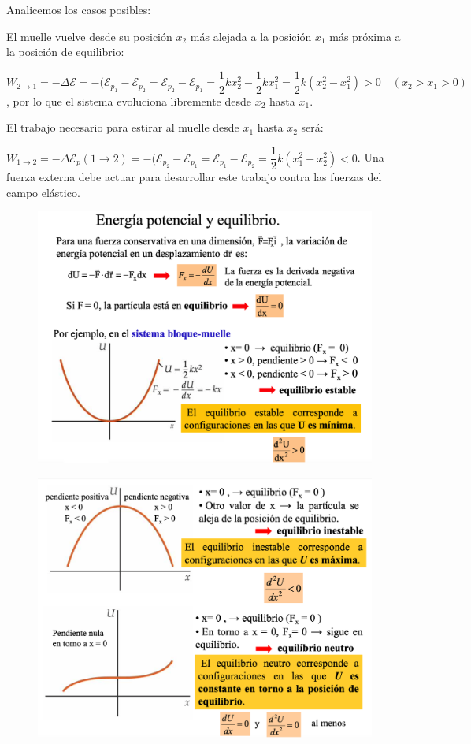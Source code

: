 Analicemos los casos posibles:

El muelle vuelve desde su posición $x_2$ más alejada a la posición $x_1$ más próxima a la posición de equilibrio:

$W_{2 \to 1}=-\Delta \mathcal E=-(\mathcal E_{p_1}-\mathcal E_{p_2}=\mathcal E_{p_2}-\mathcal E_{p_1}=\dfrac 1 2 k x_2^2- \dfrac 1 2 k x_1^2=\dfrac 12 k (x_2^2-x_1^2)>0 \quad (x_2>x_1>0)$, por lo que el sistema evoluciona libremente desde $x_2$ hasta $x_1$.

El trabajo necesario para estirar al muelle desde $x_1$ hasta $x_2$ será:

$W_{1 \to 2}=-\Delta \mathcal E_p (1 \to 2)=-(\mathcal E_{p_2}-\mathcal E_{p_1}=\mathcal E_{p_1}-\mathcal E_{p_2}=\dfrac 1 2 k (x_1^2-x_2^2)<0$. Una fuerza externa debe actuar para desarrollar este trabajo contra las fuerzas del campo elástico.

\vspace{10mm} %
\begin{figure}[H]
	\centering
	\includegraphics[width=.95\textwidth]{imagenes/imagenes03/T03IM50.png}
	\end{figure}
	
\begin{figure}[H]
	\centering
	\includegraphics[width=.95\textwidth]{imagenes/imagenes03/T03IM51.png}
	\end{figure}


